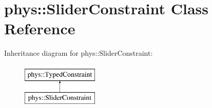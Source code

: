 \hypertarget{classphys_1_1SliderConstraint}{
\section{phys::SliderConstraint Class Reference}
\label{dc/d72/classphys_1_1SliderConstraint}
}
Inheritance diagram for phys::SliderConstraint:\begin{figure}[H]
\begin{center}
\leavevmode
\includegraphics[height=2cm]{dc/d72/classphys_1_1SliderConstraint}
\end{center}
\end{figure}
